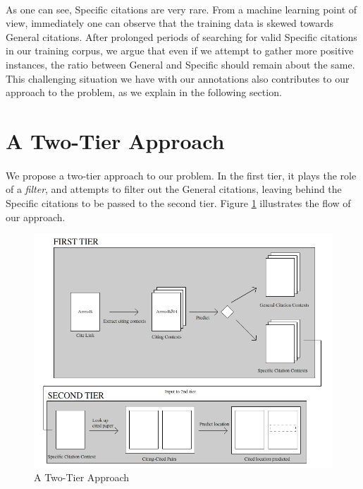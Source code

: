 \paragraph{}
As one can see, Specific citations are very rare. From a machine learning point of view, immediately one can observe that the training data is skewed towards General citations. After prolonged periods of searching for valid Specific citations in our training corpus, we argue that even if we attempt to gather more positive instances, the ratio between General and Specific should remain about the same. This challenging situation we have with our annotations also contributes to our approach to the problem, as we explain in the following section.

\section{A Two-Tier Approach}
\paragraph{}
We propose a two-tier approach to our problem. In the first tier, it plays the role of a \textit{filter}, and attempts to filter out the General citations, leaving behind the Specific citations to be passed to the second tier. Figure \ref{fig:twotier} illustrates the flow of our approach.
\begin{figure}[h]
  \centering
  \includegraphics[scale=0.60]{./twotier}
  \caption{A Two-Tier Approach}
  \label{fig:twotier}
\end{figure}

